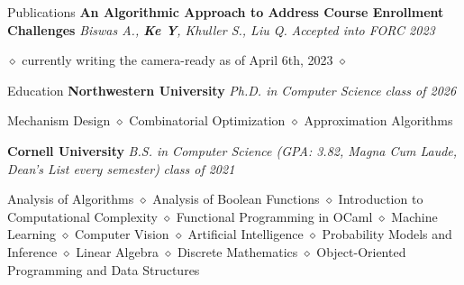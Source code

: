\documentclass{resume} %
\date{\specialdate\today}
\begin{document}




\begin{rSection}{Publications}
{\bf An Algorithmic Approach to Address Course Enrollment
Challenges} \textit{Biswas A., \textbf{Ke Y}, Khuller S., Liu Q.}  \hfill {\em Accepted into FORC 2023}
\item $\diamond$  currently writing the camera-ready as of April 6th, 2023 $\diamond$
\end{rSection}

\begin{rSection}{Education}
{\bf Northwestern University} \textit{Ph.D. in Computer Science}  \hfill {\em class of 2026}
\item Mechanism Design  $\diamond$ Combinatorial Optimization  $\diamond$ Approximation Algorithms

{\bf Cornell University} \textit{B.S. in Computer Science (GPA: 3.82, Magna Cum Laude, Dean's List every semester)}  \hfill {\em class of 2021}
\item Analysis of Algorithms  $\diamond$ Analysis of Boolean Functions $\diamond$ Introduction to Computational Complexity $\diamond$ Functional Programming in OCaml $\diamond$ Machine Learning $\diamond$ Computer Vision $\diamond$ Artificial Intelligence $\diamond$ Probability Models and Inference $\diamond$ Linear Algebra $\diamond$ Discrete Mathematics $\diamond$ Object-Oriented Programming and Data Structures

\end{rSection}



\end{document}
